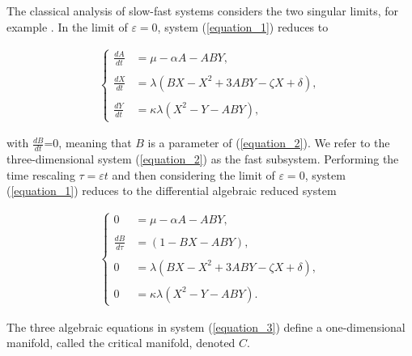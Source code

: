 \documentclass{ws-ijbc}
\begin{document}
The classical analysis of slow-fast systems considers the two singular limits, for example \cite{MMO}.  In the limit of $\varepsilon = 0$, system (\ref{equation_1}) reduces to
    
\begin{equation}
\begin{aligned}
\begin{cases}
\frac{dA}{dt} &= \mu - \alpha A - ABY, \\ \\
\frac{dX}{dt} &= \lambda(BX - X^2 +3ABY - \zeta X + \delta), \\ \\
\frac{dY}{dt} &= \kappa \lambda(X^2 - Y - ABY),
\end{cases}
\end{aligned}
\label{equation_2}
\end{equation}
    
\noindent
with $\frac{dB}{dt}$=0, meaning that $B$ is a parameter of (\ref{equation_2}).  We refer to the three-dimensional system (\ref{equation_2}) as the fast subsystem.  Performing the time rescaling $\tau = \varepsilon t$ and then considering the limit of $\varepsilon = 0$, system (\ref{equation_1}) reduces to the differential algebraic reduced system
    
 \begin{equation}
\begin{aligned}
\begin{cases}
0 &= \mu - \alpha A - ABY, \\ \\
\frac{dB}{d\tau} &= (1-BX - ABY), \\ \\
0 &= \lambda (BX - X^2 +3ABY - \zeta X + \delta), \\ \\
0 &= \kappa \lambda(X^2 - Y - ABY).
\end{cases}
\end{aligned}
\label{equation_3}
\end{equation}
    
\noindent
The three algebraic equations in system (\ref{equation_3}) define a one-dimensional manifold, called the critical manifold, denoted $C$.
\end{document}
